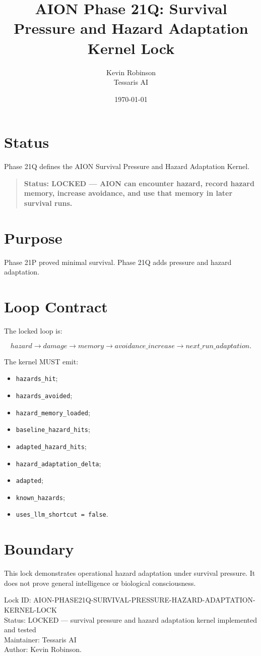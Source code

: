 \documentclass[11pt,a4paper]{article}
\title{\textbf{AION Phase 21Q: Survival Pressure and Hazard Adaptation Kernel Lock}}
\author{Kevin Robinson\\Tessaris AI}
\date{\today}
\begin{document}
\maketitle

\section{Status}

Phase 21Q defines the AION Survival Pressure and Hazard Adaptation Kernel.

\begin{quote}
\textbf{Status: LOCKED --- AION can encounter hazard, record hazard memory, increase avoidance, and use that memory in later survival runs.}
\end{quote}

\section{Purpose}

Phase 21P proved minimal survival. Phase 21Q adds pressure and hazard adaptation.

\section{Loop Contract}

The locked loop is:

\[
hazard \rightarrow damage \rightarrow memory
\rightarrow avoidance\_increase \rightarrow next\_run\_adaptation.
\]

The kernel MUST emit:

\begin{itemize}
  \item \texttt{hazards\_hit};
  \item \texttt{hazards\_avoided};
  \item \texttt{hazard\_memory\_loaded};
  \item \texttt{baseline\_hazard\_hits};
  \item \texttt{adapted\_hazard\_hits};
  \item \texttt{hazard\_adaptation\_delta};
  \item \texttt{adapted};
  \item \texttt{known\_hazards};
  \item \texttt{uses\_llm\_shortcut = false}.
\end{itemize}

\section{Boundary}

This lock demonstrates operational hazard adaptation under survival pressure. It does not prove general intelligence or biological consciousness.

\bigskip

\noindent
Lock ID: AION-PHASE21Q-SURVIVAL-PRESSURE-HAZARD-ADAPTATION-KERNEL-LOCK\\
Status: LOCKED --- survival pressure and hazard adaptation kernel implemented and tested\\
Maintainer: Tessaris AI\\
Author: Kevin Robinson.
\end{document}
